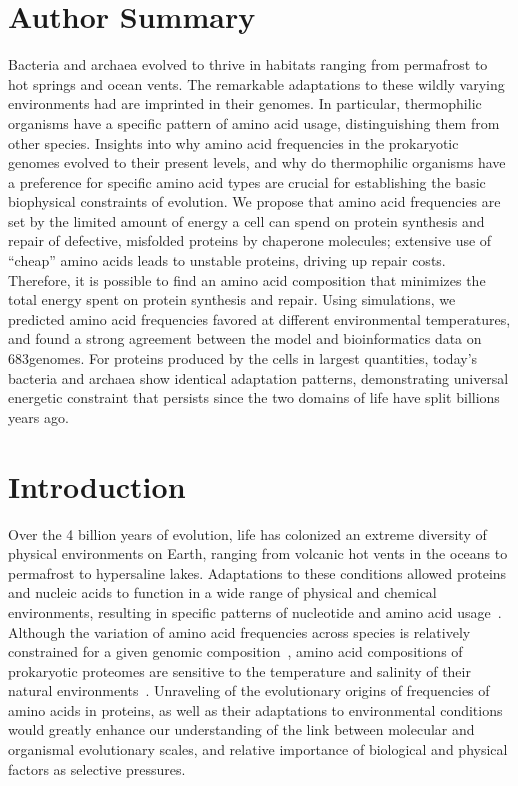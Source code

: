\documentclass[10pt,letterpaper]{article}
\newcommand{\ARCHBACTERTOTAL}{683}
\begin{document}
\section*{Author Summary}

Bacteria and archaea evolved to thrive in habitats ranging from permafrost to hot springs and ocean vents. The remarkable adaptations to these wildly varying environments had are imprinted in their genomes. In particular, thermophilic organisms have a specific pattern of amino acid usage, distinguishing them from other species. Insights into why amino acid frequencies in the prokaryotic genomes evolved to their present levels, and why do thermophilic organisms have a preference for specific amino acid types are crucial for establishing the basic biophysical constraints of evolution. We propose that amino acid frequencies are set by the limited amount of energy a cell can spend on protein synthesis and repair of defective, misfolded proteins by chaperone molecules; extensive use of “cheap” amino acids leads to unstable proteins, driving up repair costs. 
Therefore, it is possible to find an amino acid composition that minimizes the total energy spent on protein synthesis and repair. Using simulations, we predicted amino acid frequencies favored at different environmental temperatures, and found a strong agreement between the model and bioinformatics data on \ARCHBACTERTOTAL genomes. For proteins produced by the cells in largest quantities, today’s bacteria and archaea show identical adaptation patterns, demonstrating universal energetic constraint that persists since the two domains of life have split billions years ago.

\section*{Introduction}

Over the 4 billion years of evolution, life has colonized an extreme diversity of physical environments on Earth, ranging from volcanic hot vents in the oceans to permafrost to hypersaline lakes. Adaptations to these conditions allowed proteins and nucleic acids to function in a wide range of physical and chemical environments, resulting in specific patterns of nucleotide and amino acid usage~\cite{Berezovsky2007Positive,Galtier1997Relationships,Zeldovich2007Protein,England2003Natural,Sghaier2013There,Fukuchi2003Unique,Sabath2013Growth}. Although the variation of amino acid frequencies across species is relatively constrained for a given genomic  composition~\cite{Krick2014Amino,Goncearenco2014Fundamental}, amino acid compositions of prokaryotic proteomes are sensitive to the temperature and salinity of their natural environments~\cite{Fukuchi2003Unique,Kreil2001Identification}. Unraveling of the evolutionary origins of frequencies of amino acids in proteins, as well as their adaptations to environmental conditions would greatly enhance our understanding of the link between molecular and organismal evolutionary scales, and relative importance of biological and physical factors as selective pressures.
\end{document}
